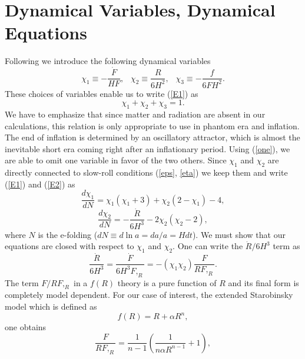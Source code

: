 \documentclass[a4paper,11pt]{article}
\begin{document}
\section{Dynamical Variables, Dynamical Equations}
Following \cite{ama1,ama3} we introduce the following dynamical variables
\begin{equation}
\chi_1\equiv -\frac{\dot{F}}{H F},\;\:\;\chi_2\equiv\frac{R}{6H^2} ,\;\:\; \chi_3\equiv-\frac{f}{6 F H^2}.
\end{equation}
These choices of variables enable us to write (\ref{E1}) as
\begin{equation}
\chi_1+\chi_2+\chi_3=1.
\label{one}
\end{equation} 
We have to emphasize that since matter and radiation are absent in our calculations, this relation is only appropriate to use in phantom era and inflation. The end of inflation is determined by an oscillatory attractor, which is almost the inevitable short era coming right after an inflationary period. Using (\ref{one}), we are able to omit one variable in favor of the two others. Since $\chi_1$ and $\chi_2$ are directly connected to slow-roll conditions (\ref{eps}, \ref{eta}) we keep them and write (\ref{E1}) and (\ref{E2}) as  
\begin{equation}
\frac{d\chi_1}{d N}=\chi_1(\chi_1+3)+\chi_2(2-\chi_1)-4,
\label{d1}
\end{equation}
\begin{equation}
\frac{d\chi_2}{d N}=-\frac{\dot{R}}{6 H^3}-2\chi_2(\chi_2-2),
\label{d2}
\end{equation}
where $N$ is the e-folding ($dN\equiv d\ln a= da/a=H dt$). We must show that our equations are closed with respect to $\chi_1$ and $\chi_2$. One can write the ${\dot{R}}/{6 H^3}$ term as  
\begin{equation}
\frac{\dot{R}}{6 H^3}=\frac{\dot{F}}{6 H^3 F, _R}=-(\chi_1 \chi_2)\frac{F}{R F, _R}.
\label{p1}
\end{equation}
The term ${F}/{R F, _R}$ in a $f(R)$ theory is a pure function of $R$ and its final form is completely model dependent. For our case of interest, the extended Starobinsky model which is defined as \cite{nsim}
\begin{equation} 
f(R)=R+\alpha R^n,
\label{mod0}
\end{equation}
one obtains
\begin{equation}
\frac{F}{R F, _R}=\frac{1}{n-1}\left(\frac{1}{n \alpha R^{n-1}}+1  \right),
\label{p2}
\end{equation}
\end{document}
